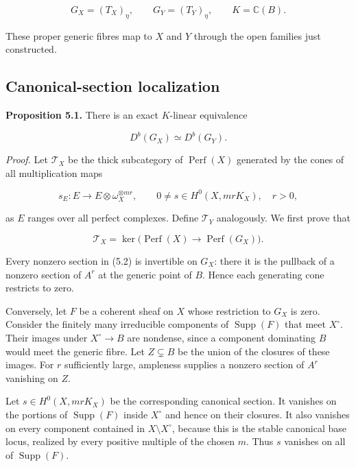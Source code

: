 \documentclass[11pt,a4paper]{article}
\begin{document}
\begin{equation*}
G_X=(T_X)_\eta,\qquad G_Y=(T_Y)_\eta,
\qquad K=\mathbb C(B).
\end{equation*}

These proper generic fibres map to $X$ and $Y$ through the open families just constructed.

\subsection{Canonical-section localization}

\noindent \textbf{Proposition 5.1.} There is an exact $K$-linear equivalence

\begin{equation*}
D^b(G_X)\simeq D^b(G_Y).
\tag{5.1}
\end{equation*}

\noindent \emph{Proof.} Let $\mathcal T_X$ be the thick subcategory of $\operatorname{Perf}(X)$ generated by the cones of all multiplication maps

\begin{equation*}
s_E:E\longrightarrow E\otimes\omega_X^{\otimes mr},
\qquad
0\neq s\in H^0(X,mrK_X),\quad r>0,
\tag{5.2}
\end{equation*}

as $E$ ranges over all perfect complexes. Define $\mathcal T_Y$ analogously. We first prove that

\begin{equation*}
\mathcal T_X=
\ker\bigl(\operatorname{Perf}(X)\longrightarrow\operatorname{Perf}(G_X)\bigr).
\tag{5.3}
\end{equation*}

Every nonzero section in (5.2) is invertible on $G_X$: there it is the pullback of a nonzero section of $A^r$ at the generic point of $B$. Hence each generating cone restricts to zero.

Conversely, let $F$ be a coherent sheaf on $X$ whose restriction to $G_X$ is zero. Consider the finitely many irreducible components of $\operatorname{Supp}(F)$ that meet $X^\circ$. Their images under $X^\circ\to B$ are nondense, since a component dominating $B$ would meet the generic fibre. Let $Z\subsetneq B$ be the union of the closures of these images. For $r$ sufficiently large, ampleness supplies a nonzero section of $A^r$ vanishing on $Z$.

Let $s\in H^0(X,mrK_X)$ be the corresponding canonical section. It vanishes on the portions of $\operatorname{Supp}(F)$ inside $X^\circ$ and hence on their closures. It also vanishes on every component contained in $X\setminus X^\circ$, because this is the stable canonical base locus, realized by every positive multiple of the chosen $m$. Thus $s$ vanishes on all of $\operatorname{Supp}(F)$.
\end{document}
